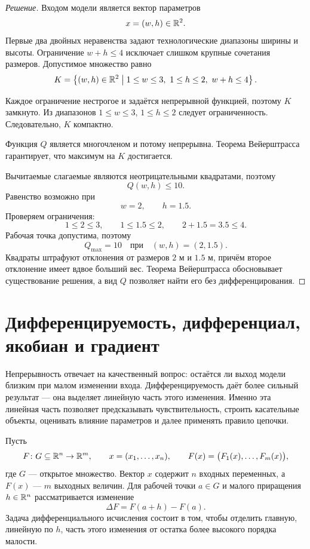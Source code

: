\begin{proof}[Решение]
Входом модели является вектор параметров
\[
x=(w,h)\in\mathbb{R}^2.
\]
Первые два двойных неравенства задают технологические диапазоны ширины и высоты. Ограничение \(w+h\leq4\) исключает слишком крупные сочетания размеров. Допустимое множество равно
\[
K=
\left\{(w,h)\in\mathbb{R}^2
\;\middle|\;
1\leq w\leq3,
\ 1\leq h\leq2,
\ w+h\leq4
\right\}.
\]

Каждое ограничение нестрогое и задаётся непрерывной функцией, поэтому \(K\) замкнуто. Из диапазонов \(1\leq w\leq3\), \(1\leq h\leq2\) следует ограниченность. Следовательно, \(K\) компактно.

Функция \(Q\) является многочленом и потому непрерывна. Теорема Вейерштрасса гарантирует, что максимум на \(K\) достигается.

Вычитаемые слагаемые являются неотрицательными квадратами, поэтому
\[
Q(w,h)\leq10.
\]
Равенство возможно при
\[
w=2,
\qquad
h=1.5.
\]
Проверяем ограничения:
\[
1\leq2\leq3,
\qquad
1\leq1.5\leq2,
\qquad
2+1.5=3.5\leq4.
\]
Рабочая точка допустима, поэтому
\[
Q_{\max}=10
\quad\text{при}\quad
(w,h)=(2,1.5).
\]
Квадраты штрафуют отклонения от размеров \(2\) м и \(1.5\) м, причём второе отклонение имеет вдвое больший вес. Теорема Вейерштрасса обосновывает существование решения, а вид \(Q\) позволяет найти его без дифференцирования.
\end{proof}


\section{Дифференцируемость, дифференциал, якобиан и градиент}
\label{sec:differential-jacobian-gradient}

Непрерывность отвечает на качественный вопрос: остаётся ли выход модели близким при малом изменении входа. Дифференцируемость даёт более сильный результат --- она выделяет линейную часть этого изменения. Именно эта линейная часть позволяет предсказывать чувствительность, строить касательные объекты, оценивать влияние параметров и далее применять правило цепочки.

Пусть
\[
F\colon G\subseteq\mathbb{R}^n\to\mathbb{R}^m,
\qquad
x=(x_1,\dots,x_n),
\qquad
F(x)=\bigl(F_1(x),\dots,F_m(x)\bigr),
\]
где \(G\) --- открытое множество. Вектор \(x\) содержит \(n\) входных переменных, а \(F(x)\) --- \(m\) выходных величин. Для рабочей точки \(a\in G\) и малого приращения \(h\in\mathbb{R}^n\) рассматривается изменение
\[
\Delta F
=
F(a+h)-F(a).
\]
Задача дифференциального исчисления состоит в том, чтобы отделить главную, линейную по \(h\), часть этого изменения от остатка более высокого порядка малости.

